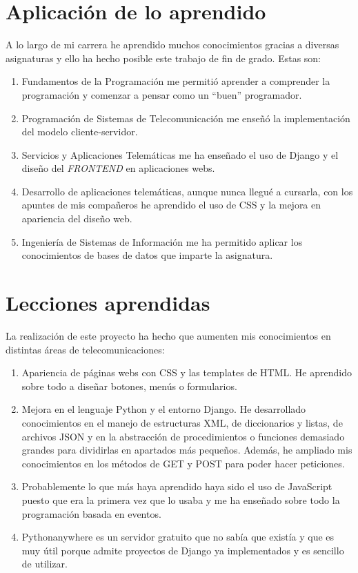 \documentclass[a4paper, 12pt]{book}
\begin{document}
\section{Aplicación de lo aprendido}
\label{sec:aplicacion}

A lo largo de mi carrera he aprendido muchos conocimientos gracias a diversas asignaturas y ello ha hecho posible este trabajo de fin de grado. Estas son:

\begin{enumerate}
\item Fundamentos de la Programación me permitió aprender a comprender la programación y comenzar a pensar como un ``buen'' programador.
\item Programación de Sistemas de Telecomunicación me enseñó la implementación del modelo cliente-servidor.
 \item Servicios y Aplicaciones Telemáticas me ha enseñado el uso de Django y el diseño del \textit{FRONTEND} en aplicaciones webs.
  \item Desarrollo de aplicaciones telemáticas, aunque nunca llegué a cursarla, con los apuntes de mis compañeros he aprendido el uso de CSS y la mejora en apariencia del diseño web. 
  \item Ingeniería de Sistemas de Información me ha permitido aplicar los conocimientos de bases de datos que imparte la asignatura.
\end{enumerate}

\section{Lecciones aprendidas}
\label{sec:lecciones_aprendidas}
La realización de este proyecto ha hecho que aumenten mis conocimientos en distintas áreas de telecomunicaciones:

\begin{enumerate}
  \item Apariencia de páginas webs con CSS y las templates de HTML. He aprendido sobre todo a diseñar botones, menús o formularios.
  \item Mejora en el lenguaje Python y el entorno Django. He desarrollado conocimientos en el manejo de estructuras XML, de diccionarios y listas, de archivos JSON y en la abstracción de procedimientos o funciones demasiado grandes para dividirlas en apartados más pequeños. Además, he ampliado mis conocimientos en los métodos de GET y POST para poder hacer peticiones.
  \item Probablemente lo que más haya aprendido haya sido el uso de JavaScript puesto que era la primera vez que lo usaba y me ha enseñado sobre todo la programación basada en eventos.
  \item Pythonanywhere es un servidor gratuito que no sabía que existía y que es muy útil porque admite proyectos de Django ya implementados y es sencillo de utilizar.
\end{enumerate}
\end{document}
